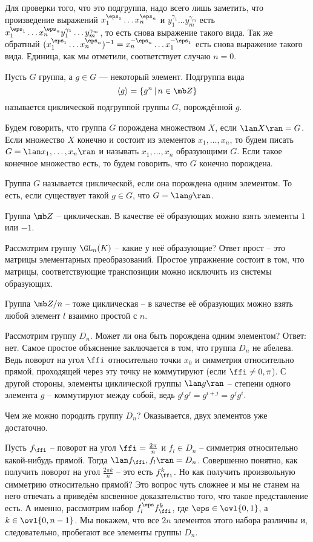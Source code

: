 Для проверки того, что это подгруппа, надо всего лишь заметить, что произведение выражений $x_1^{\eps_1}\dots x_n^{\eps_n}$  и $y_1^{\gamma_1}\dots y_m^{\gamma_m}$ есть $x_1^{\eps_1}\dots x_n^{\eps_n}y_1^{\gamma_1}\dots y_m^{\gamma_m}$, то есть снова выражение такого вида. 
Так же обратный $(x_1^{\eps_1}\dots x_n^{\eps_n})^{-1}=x_n^{-\eps_n}\dots x_1^{-\eps_1}$ есть снова выражение такого вида. Единица, как мы отметили, соответствует случаю $n=0$.
\endproof

\dfn
Пусть $G$ группа, а $g\in G$ --- некоторый элемент. Подгруппа вида $$\langle g \rangle=\{g^n\,|\, n\in \mb Z\}$$
называется циклической подгруппой группы $G$, порождённой $g$.
\edfn

\dfn Будем говорить, что группа $G$ порождена множеством $X$, если $\lan X\ran =G$. Если множество $X$ конечно и состоит из элементов $x_1,\dots,x_n$, то будем писать $G=\lan x_1,\dots,x_n \ran$ и называть $x_1,\dots,x_n$ образующими $G$. Если такое конечное множество есть, то  будем говорить, что $G$ конечно порождена. 
\edfn

\dfn Группа $G$ называется циклической, если она порождена одним элементом. То есть, если существует такой $g\in G$, что $G=\lan g \ran$.
\edfn

\exm
\enm
\item Группа $\mb Z$ -- циклическая. В качестве её образующих можно взять элементы $1$ или $-1$.
\item Рассмотрим группу $\GL_n(K)$ -- какие у неё образующие? Ответ прост -- это матрицы элементарных преобразований. Простое упражнение состоит в том, что матрицы, соответствующие транспозиции можно исключить из системы образующих.
\item Группа $\mb Z/n$ -- тоже циклическая -- в качестве её образующих можно взять любой элемент $l$ взаимно простой с $n$.
\item Рассмотрим группу $D_n$. Может ли она быть порождена одним элементом? Ответ: нет. Самое простое объяснение заключается в том, что группа $D_n$ не абелева. Ведь поворот на угол $\ffi$ относительно точки $x_0$ и симметрия относительно прямой, проходящей через эту точку не коммутируют (если $\ffi \neq 0, \pi $). С другой стороны, элементы циклической группы $\lan g\ran$ -- степени одного элемента $g$ -- коммутируют между собой, ведь $g^ig^j=g^{i+j}=g^jg^i$.

Чем же можно породить группу $D_n$? Оказывается, двух элементов уже достаточно.

\utv Пусть $f_{\ffi}$ -- поворот на угол   $\ffi=\frac{2\pi}{n}$ и $f_l \in D_n$ -- симметрия относительно какой-нибудь прямой.
Тогда $\lan f_{\ffi},f_l\ran =D_n$.
\eutv
\proof
Совершенно понятно, как получить поворот на угол $\frac{2\pi k}n$ -- это есть $f_{\ffi}^k$. Но как получить произвольную симметрию относительно прямой? Это вопрос чуть сложнее и мы не станем на него отвечать а приведём косвенное доказательство того, что такое представление есть. А именно, рассмотрим набор $f_l^{\eps} f_{\ffi}^k$, где $\eps\in \ovl{0,1}$, а $k\in \ovl{0,n-1}$.  Мы покажем, что все $2n$ элементов этого набора различны и, следовательно, пробегают все элементы группы $D_n$. 

